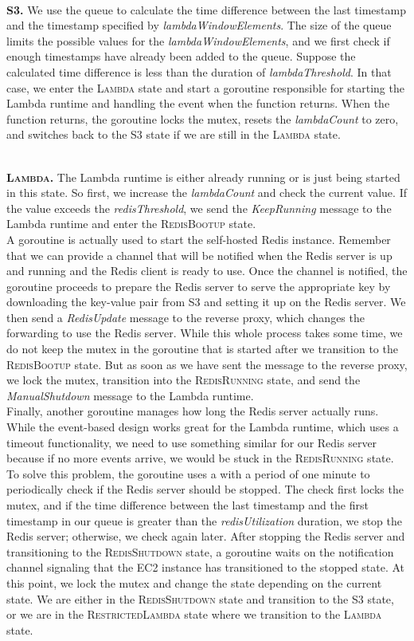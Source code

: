 ~\\
\textbf{\textsc{S3.}} We use the queue to calculate the time difference between the last timestamp and the timestamp specified by \emph{lambdaWindowElements}. The size of the queue limits the possible values for the \emph{lambdaWindowElements}, and we first check if enough timestamps have already been added to the queue. Suppose the calculated time difference is less than the duration of \emph{lambdaThreshold}. In that case, we enter the \textsc{Lambda} state and start a goroutine responsible for starting the Lambda runtime and handling the event when the function returns. When the function returns, the goroutine locks the mutex, resets the \emph{lambdaCount} to zero, and switches back to the \textsc{S3} state if we are still in the \textsc{Lambda} state.

~\\
\textbf{\textsc{Lambda.}} The Lambda runtime is either already running or is just being started in this state. So first, we increase the \emph{lambdaCount} and check the current value. If the value exceeds the \emph{redisThreshold}, we send the \emph{KeepRunning} message to the Lambda runtime and enter the \textsc{RedisBootup} state.\\
A goroutine is actually used to start the self-hosted Redis instance. Remember that we can provide a channel that will be notified when the Redis server is up and running and the Redis client is ready to use. Once the channel is notified, the goroutine proceeds to prepare the Redis server to serve the appropriate key by downloading the key-value pair from S3 and setting it up on the Redis server. We then send a \emph{RedisUpdate} message to the reverse proxy, which changes the forwarding to use the Redis server. While this whole process takes some time, we do not keep the mutex in the goroutine that is started after we transition to the \textsc{RedisBootup} state. But as soon as we have sent the message to the reverse proxy, we lock the mutex, transition into the \textsc{RedisRunning} state, and send the \emph{ManualShutdown} message to the Lambda runtime.\\
Finally, another goroutine manages how long the Redis server actually runs. While the event-based design works great for the Lambda runtime, which uses a timeout functionality, we need to use something similar for our Redis server because if no more events arrive, we would be stuck in the \textsc{RedisRunning} state. To solve this problem, the goroutine uses a  with a period of one minute to periodically check if the Redis server should be stopped. The check first locks the mutex, and if the time difference between the last timestamp and the first timestamp in our queue is greater than the \emph{redisUtilization} duration, we stop the Redis server; otherwise, we check again later. After stopping the Redis server and transitioning to the \textsc{RedisShutdown} state, a goroutine waits on the notification channel signaling that the EC2 instance has transitioned to the stopped state. At this point, we lock the mutex and change the state depending on the current state. We are either in the \textsc{RedisShutdown} state and transition to the \textsc{S3} state, or we are in the \textsc{RestrictedLambda} state where we transition to the \textsc{Lambda} state. 

